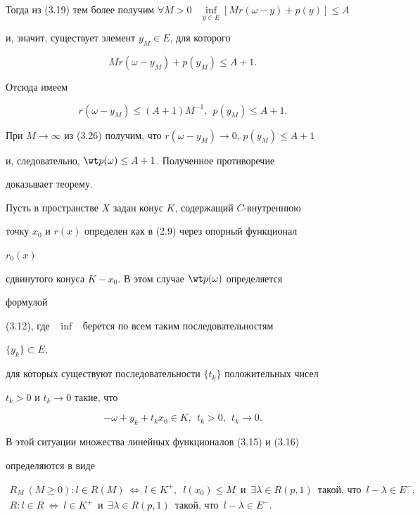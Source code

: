 \begin{pf}
Тогда из (3.19) тем более получим $\forall M>0$ \ $\inf\limits_{y\in 


E}[M r(\omega-y)+p(y)]\le A$ 


и, значит, существует элемент $y_M\in E$, для которого 


$$ 


M r(\omega-y_M)+p(y_M)\le A+1. 


$$ 


Отсюда имеем 


\begin{equation} 


r(\omega-y_M)\le(A+1)M^{-1},\ \ p(y_M)\le A+1. 


\end{equation} 


При $M\to\infty$ из (3.26) получим, что $r(\omega-y_M)\to0$, $p(y_M)\le 


A+1$ 


и, следовательно, $\wt p(\omega)\le A+1$. Полученное противоречие 


доказывает теорему. 


\end{pf} 


 


Пусть в пространстве $X$ задан конус $K$, содержащий $C$-внутреннюю 


точку $x_0$ и $r(x)$ определен как в (2.9) через опорный функционал 


$r_0(x)$ 


сдвинутого конуса $K-x_0$. В этом случае $\wt p(\omega)$ определяется 


формулой 


(3.12), где \ $\inf$ \ берется по всем таким последовательностям 


$\{y_k\}\subset E$, 


для которых существуют последовательности $\{t_k\}$ положительных чисел 


$t_k>0$ и $t_k\to0$ такие, что 


\begin{equation} 


-\omega+y_k+t_k x_0\in K,\ \ t_k>0,\ \ t_k\to0. 


\end{equation} 


В этой ситуации множества линейных функционалов (3.15) и (3.16) 


определяются в виде


\begin{gather} 


R_M\ (M\ge0):l\in R(M)\ \Longleftrightarrow\ l\in K^+, 


\ \; l(x_0)\le M \ \;\text{и} \ \; \exists\lambda\in R(p,1) 


\ \; \text{такой, что}\ \; l-\lambda\in E^-, \\ 


% 


R:l\in R\ \Longleftrightarrow\ l\in K^+\ \; \text{и}\ \; 


\exists\lambda\in R(p,1)\ \; \text{такой, что} 


\ \; l-\lambda\in E^-. 


\end{gather} 


